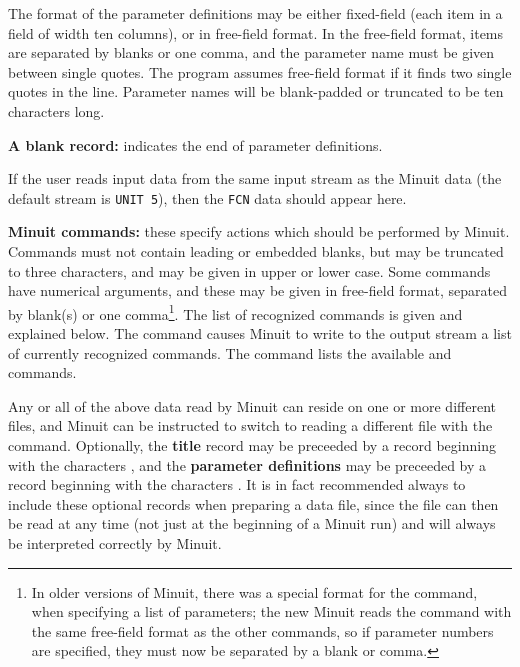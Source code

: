 \begin{UL}
      The format of the parameter definitions may be either
      fixed-field (each item in a field of width ten columns),
      or in free-field format.
      In the free-field format, items are separated by blanks or one comma,
      and the parameter name must be given between single quotes.
      The program assumes free-field format if it finds two single
      quotes in the line.
      Parameter names will be blank-padded or truncated to be
      ten characters long.
\item {\bf A blank record:} indicates the end of parameter definitions.
\item If the user  reads input data from the same input stream as the
       Minuit data (the default stream is \texttt{UNIT 5}),
       then the \texttt{FCN} data should appear here.
\item {\bf Minuit commands:} these specify actions which should be performed by Minuit.
       Commands must not contain leading or embedded blanks, but may be
       truncated to three characters, and may be given in upper or lower case.
       Some commands have numerical arguments, and these may be given in
       free-field format, separated by blank(s) or one comma\footnote{%
       In older versions of Minuit, there was a special format for the 
       command, when specifying a list of parameters; the new Minuit reads
       the  command with the same free-field format as the other
       commands, so if parameter numbers are specified, they must now
       be separated by a blank or comma.}.
       The list of recognized commands is given and explained below.
       The command  causes Minuit to write to the output stream a list
       of currently recognized commands.
       The command  lists the available  
       and  commands.
\end{UL}

Any or all of the above data read by Minuit
can reside on one or more different files,
and Minuit can be instructed
to switch to reading a different file with the  command.
Optionally, the {\bf title} record may be preceeded by a record
beginning with the characters , and the
{\bf parameter definitions} may be preceeded by a record
beginning with the characters .
It is in fact recommended always to include these optional
records when preparing a data file, since the file can then be
read at any time (not just at the beginning of a Minuit run)
and will always be interpreted correctly by Minuit.
 
